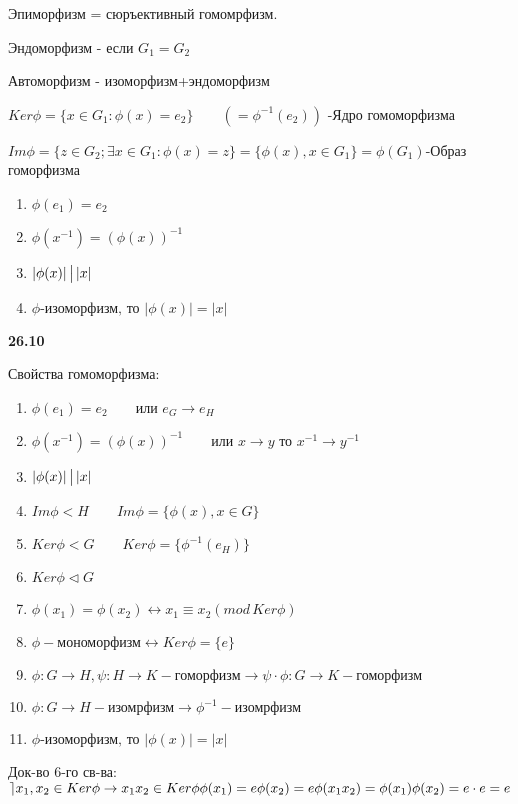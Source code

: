 \documentclass[12pt]{article}
\begin{document}
	Эпиморфизм = сюръективный гомомрфизм.
	
	Эндоморфизм - если $G_1=G_2$
	
	Автоморфизм - изоморфизм+эндоморфизм
	
	$Ker\phi =\{x\in G_1 :\phi (x)=e_2\} \qquad (=\phi ^{-1}(e_2))$ -Ядро гомоморфизма
	
	$Im\phi =\{z\in G_2 ; \exists x\in G_1:\phi (x)=z\}=\{\phi (x), x\in G_1\}=\phi (G_1)$-Образ гоморфизма
	
	\begin{Th}
		\begin{enumerate}
			\item $\phi (e_1)=e_2$
			\item $\phi (x^{-1})=(\phi (x))^{-1}$
			\item $| \phi (x)|\, \big{|} \, |x|$
			\item $\phi \text{-изоморфизм, то } |\phi (x)|=|x|$
		\end{enumerate}
	\end{Th}
	
	\textbf{26.10}
	
	Свойства гомоморфизма: 
	\begin{enumerate}
		\item $\phi (e_1)=e_2 \qquad \text{или } e_G \rightarrow e_H$
		\item $\phi (x^{-1})=(\phi (x))^{-1} \qquad \text{или } x\rightarrow y  \text{ то } x^{-1}\rightarrow y^{-1}$
		\item $| \phi (x)|\, \big{|} \, |x|$
		\item $Im\phi < H \qquad Im\phi=\{ \phi (x), x\in G \}$
		\item $Ker\phi <G  \qquad  Ker \phi=\{ \phi^{-1}(e_H) \}$
		\item $Ker\phi \lhd G$
		\item $\phi (x_1)=\phi (x_2) \leftrightarrow x_1 \equiv x_2 (mod \, Ker\phi) $
		\item $\phi- \text{мономорфизм}\leftrightarrow Ker \phi =\{e\} $
		\item $\phi :G \rightarrow H, \psi :H\rightarrow K -\text{гоморфизм} \rightarrow \psi \cdot \phi : G \rightarrow K - \text{гоморфизм}$
		\item $\phi :G\rightarrow H-\text{изомрфизм} \rightarrow \phi^{-1}-\text{изомрфизм} $
		\item $\phi \text{-изоморфизм, то } |\phi (x)|=|x|$
	\end{enumerate}
	
	Док-во 6-го св-ва:$\rceil x_1, x_2 \in Ker\phi \rightarrow x_1 x_2 \in Ker\phi \\
	\phi (x_1)=e \\
	\phi (x_2)=e \\
	\phi (x_1x_2)=\phi (x_1) \phi (x_2)=e\cdot e=e$
	
\end{document}
